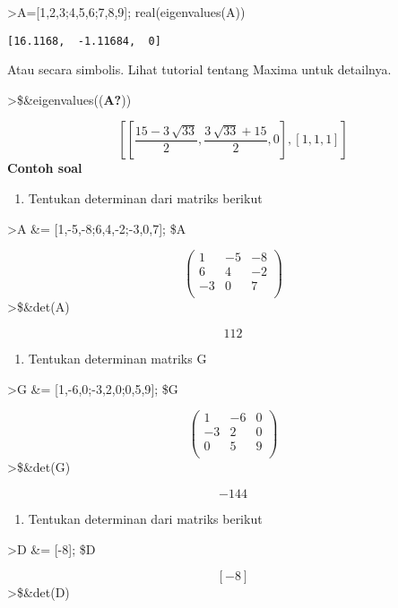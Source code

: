 \documentclass[
]{book}
\providecommand{\tightlist}{%
  \setlength{\itemsep}{0pt}\setlength{\parskip}{0pt}}
\begin{document}
\textgreater A={[}1,2,3;4,5,6;7,8,9{]}; real(eigenvalues(A))

\begin{verbatim}
[16.1168,  -1.11684,  0]
\end{verbatim}

Atau secara simbolis. Lihat tutorial tentang Maxima untuk detailnya.

\textgreater\$\&eigenvalues((\textbf{A?}))

\[\left[ \left[ \frac{15-3\,\sqrt{33}}{2} , \frac{3\,\sqrt{33}+15}{2} , 0 \right]  , \left[ 1 , 1 , 1 \right]  \right]\] \textbf{Contoh soal}

\begin{enumerate}
\def\labelenumi{\arabic{enumi}.}
\tightlist
\item
  Tentukan determinan dari matriks berikut
\end{enumerate}

\textgreater A \&= {[}1,-5,-8;6,4,-2;-3,0,7{]}; \$A

\[\begin{pmatrix}1 & -5 & -8 \\ 6 & 4 & -2 \\ -3 & 0 & 7 \\ \end{pmatrix}\]\textgreater\$\&det(A)

\[112\]

\begin{enumerate}
\def\labelenumi{\arabic{enumi}.}
\setcounter{enumi}{1}
\tightlist
\item
  Tentukan determinan matriks G
\end{enumerate}

\textgreater G \&= {[}1,-6,0;-3,2,0;0,5,9{]}; \$G

\[\begin{pmatrix}1 & -6 & 0 \\ -3 & 2 & 0 \\ 0 & 5 & 9 \\ \end{pmatrix}\]\textgreater\$\&det(G)

\[-144\]

\begin{enumerate}
\def\labelenumi{\arabic{enumi}.}
\setcounter{enumi}{2}
\tightlist
\item
  Tentukan determinan dari matriks berikut
\end{enumerate}

\textgreater D \&= {[}-8{]}; \$D

\[\left[ -8 \right]\]\textgreater\$\&det(D)
\end{document}
